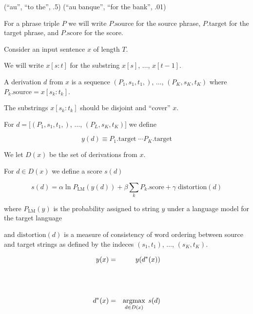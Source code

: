 {\vfill
(``au'', ``to the'', .5) \hfill (``au banque'', ``for the bank'', .01)

\vfill
For a phrase triple $P$ we will write $P.\mathrm{source}$ for the source phrase, $P.\mathrm{target}$ for the target phrase, and $P.\mathrm{score}$ for the score.


Consider an input sentence $x$ of length $T$.

\vfill
We will write $x[s:t]$ for the substring $x[s]$, $\ldots$, $x[t-1]$.

\vfill
A derivation $d$ from $x$ is a sequence $(P_1,s_1,t_1,)$, $\ldots$, $(P_K,s_K,t_K)$ where $P_k.\mathrm{source} = x[s_k:t_k]$.

\vfill
The substrings $x[s_k:t_k]$ should be disjoint and ``cover'' $x$.

\vfill
For $d = [(P_1,s_1,t_1,)$, $\ldots$, $(P_L,s_K,t_K)]$ we define

$$ y(d) \equiv P_1.\mathrm{target}\;\cdots P_K.\mathrm{target}$$

\vfill
We let $D(x)$ be the set of derivations from $x$.


For $d \in D(x)$ we define a score $s(d)$

\vfill
$$s(d) = \alpha \ln P_\mathrm{LM}(y(d)) + \beta \sum_k P_k.\mathrm{score} + \gamma \;\mathrm{distortion}(d)$$

\vfill
where $P_{\mathrm{LM}}(y)$ is the probability assigned to string $y$ under a language model for the target language

\vfill
and $\mathrm{distortion}(d)$ is a measure of consistency of word ordering between source and target strings as defined by
the indeces $(s_1,t_1)$, $\ldots$, $(s_K,t_K)$.


\begin{eqnarray*}
  y(x) & = & y(d^*(x)) \\
  \\
  \\
  \\
  d^*(x) & = & \operatorname*{argmax}_{d \in D(x)} \;s(d)
\end{eqnarray*}

}

